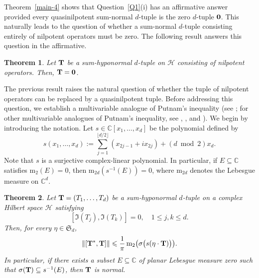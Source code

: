 \documentclass[10pt, a4paper, oneside, reqno]{amsproc}
\numberwithin{equation}{section}
\newtheorem{theorem}{Theorem}[section]
\theoremstyle{remark}
\theoremstyle{definition}
\newcommand*{\Le}{\leqslant}
\begin{document}
Theorem~\ref{main-4} shows that Question~\ref{Q1}(i) has an affirmative answer provided every quasinilpotent sum-normal $d$-tuple is the zero $d$-tuple ${\bf 0}$. 
This naturally leads to the question of whether a sum-normal $d$-tuple consisting entirely of nilpotent operators must be zero. The following result answers this question in the affirmative.

\begin{theorem} \label{nilpotent-thm}
Let ${\bf T}$ be a sum-hyponormal $d$-tuple on $\mathcal H$ consisting of nilpotent operators.  
Then, ${\bf T}={\bf 0}$.
\end{theorem}


The previous result raises the natural question of whether the tuple of nilpotent operators can be replaced by a quasinilpotent tuple. Before addressing this question, we establish a multivariable analogue of Putnam's inequality (see \cite[Theorem~1]{P1970}; for other multivariable analogues of Putnam's inequality, see \cite[Theorem~1.1]{CCHZ2000}, \cite[Theorem~3.2]{M2002}, and \cite[Theorem~5]{X1983}). We begin by introducing the notation. Let $s \in \mathbb C[x_1, \ldots, x_d]$ be the polynomial defined by
\begin{equation}
\label{s-polynomial}
{s}(x_1, \ldots, x_d):=\sum_{j=1}^{\lfloor d/2 \rfloor}(x_{2j-1}+ix_{2j})+  (d \bmod 2)x_{d}.
\end{equation}  
Note that $s$ is a surjective complex-linear polynomial. In particular, if $E \subseteq \mathbb C$ satisfies $\mathrm{m}_2(E)=0$, then $\mathrm{m}_{2d}(s^{-1}(E))=0$, where $\mathrm{m}_{2d}$ denotes the Lebesgue measure on $\mathbb C^d$.
\begin{theorem} \label{new-thm-Putnam}
Let ${\bf T}=(T_1, \ldots, T_d)$ be a sum-hyponormal $d$-tuple on a complex Hilbert space $\mathcal H$ satisfying
\begin{equation}
\label{Im-commute-new}
[\Im(T_j), \Im(T_k)]=0, \quad 1 \Le j, k \Le d.
\end{equation} 
Then, for every $\eta \in \mathfrak S_d$, 
\begin{equation}
\label{Putnam-d-var}
\|[{\bf T}^*, {\bf T}]\| \Le \frac{1}{\pi}\, \mathrm{m}_2\big(\sigma\big(s(\eta \cdot {\bf T})\big)\big).
\end{equation}
In particular, if there exists a subset $E \subseteq \mathbb C$ of planar Lebesgue measure zero such that $\sigma({\bf T}) \subseteq s^{-1}(E)$, then ${\bf T}$ is normal.
\end{theorem}
\end{document}
